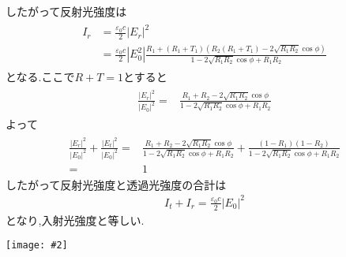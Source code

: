 \documentclass[uplatex,a4j,11pt,dvipdfmx]{jsarticle}
\makeatletter
\def\fgcaption{\def\@captype{figure}\caption}
\newcommand{\mfig}[3][width=15cm]{
\begin{center}
\texttt{[image: \#2]}
\fgcaption{#3 \label{fig:#2}}
\end{center}
}
\makeatother
\begin{document}
したがって反射光強度は
\begin{align}
  \begin{split}
    I_r&=\frac{\varepsilon_0c}{2}|E_r|^2\\
    &=\frac{\varepsilon_0c}{2}|E_0^2|\frac{R_1+(R_1+T_1)\left(R_2(R_1+T_1)-2\sqrt{R_1R_2}\cos\phi\right)}{1-2\sqrt{R_1R_2}\cos\phi+R_1R_2}
  \end{split}
\end{align}
となる.ここで$R+T=1$とすると
\begin{align}
  \begin{split}
    \frac{|E_r|^2}{|E_0|^2}=&
    \frac{R_1+R_2-2\sqrt{R_1R_2}\cos\phi}{1-2\sqrt{R_1R_2}\cos\phi+R_1R_2}
  \end{split}
\end{align}
よって
\begin{align}
  \begin{split}
    \frac{|E_r|^2}{|E_0|^2}+\frac{|E_t|^2}{|E_0|^2}=&
    \frac{R_1+R_2-2\sqrt{R_1R_2}\cos\phi}{1-2\sqrt{R_1R_2}\cos\phi+R_1R_2}+
    \frac{(1-R_1)(1-R_2)}{1-2\sqrt{R_1R_2}\cos\phi+R_1R_2}\\
    =&1
  \end{split}
\end{align}
したがって反射光強度と透過光強度の合計は
\begin{align}
  I_t+I_r=\frac{\varepsilon_0c}{2}|E_0|^2
\end{align}
となり,入射光強度と等しい.
\mfig[width=6cm]{laser_05_q61.pdf}{共振器での反射の模式図}
\end{document}
